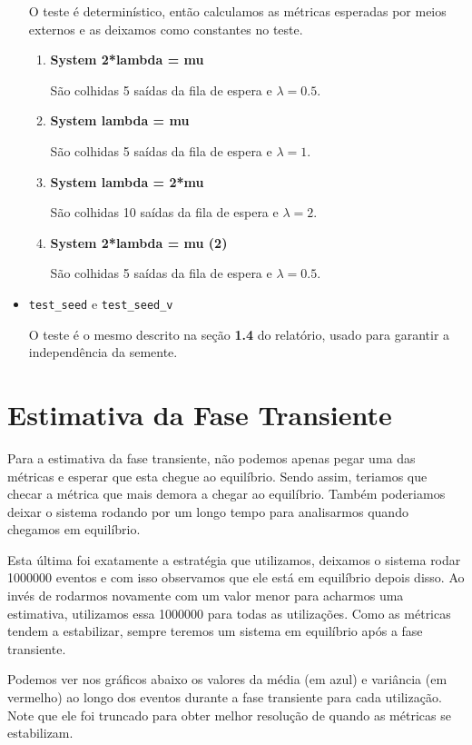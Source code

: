 \documentclass[a4paper]{article}
\newcommand{\inlcode}{\texttt}
\begin{document}
\begin{itemize}
        O teste é determinístico, então
        calculamos as métricas esperadas
        por meios externos e
        as deixamos como constantes no teste.
        \begin{enumerate}
            \item \textbf{System 2*lambda = mu} \par
                São colhidas 5 saídas da fila de espera
                e \(\lambda = 0.5\).
            \item \textbf{System lambda = mu} \par
                São colhidas 5 saídas da fila de espera
                e \(\lambda = 1\).
            \item \textbf{System lambda = 2*mu} \par
                São colhidas 10 saídas da fila de espera
                e \(\lambda = 2\).
            \item \textbf{System 2*lambda = mu (2)} \par
                São colhidas 5 saídas da fila de espera
                e \(\lambda = 0.5\).
        \end{enumerate}
    \item \inlcode{test\_seed} e \inlcode{test\_seed\_v} \par
        O teste é o mesmo descrito
        na seção \textbf{1.4} do relatório,
        usado para garantir a independência da semente.
\end{itemize}

\section{Estimativa da Fase Transiente}
Para a estimativa da fase transiente,
não podemos apenas pegar uma das métricas e
esperar que esta chegue ao equilíbrio.
Sendo assim, teriamos que checar a métrica
que mais demora a chegar ao equilíbrio.
Também poderiamos deixar o sistema rodando
por um longo tempo para analisarmos quando chegamos em equilíbrio.

Esta última foi exatamente a estratégia que utilizamos,
deixamos o sistema rodar 1000000 eventos e
com isso observamos que ele está em equilíbrio depois disso.
Ao invés de rodarmos novamente com um valor menor
para acharmos uma estimativa,
utilizamos essa 1000000 para todas as utilizações.
Como as métricas tendem a estabilizar,
sempre teremos um sistema em equilíbrio após a fase transiente.

Podemos ver nos gráficos abaixo os valores da média (em azul)
e variância (em vermelho)
ao longo dos eventos durante a fase transiente para cada utilização.
Note que ele foi truncado para obter melhor resolução
de quando as métricas se estabilizam.
\end{document}
